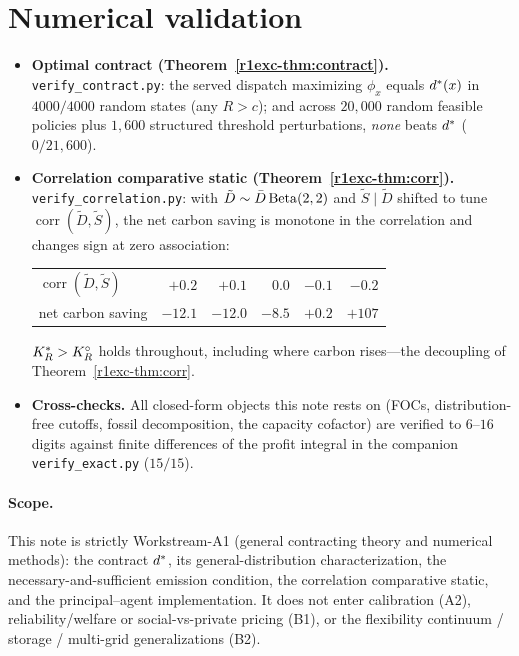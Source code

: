 \section{Numerical validation}\label{r1exc-sec:num}

\begin{itemize}[leftmargin=1.6em]
  \item \textbf{Optimal contract (Theorem~\ref{r1exc-thm:contract}).}
        \texttt{verify\_contract.py}: the served dispatch maximizing
        $\phi_x$ equals $d^{*}(x)$ in $4000/4000$ random states (any $R>c$); and
        across $20{,}000$ random feasible policies plus $1{,}600$ structured
        threshold perturbations, \emph{none} beats $d^{*}$ ($0/21{,}600$).
  \item \textbf{Correlation comparative static (Theorem~\ref{r1exc-thm:corr}).}
        \texttt{verify\_correlation.py}: with $\tilde D\sim\bar D\,\mathrm{Beta}(2,2)$
        and $\tilde S\mid\tilde D$ shifted to tune $\operatorname{corr}(\tilde D,\tilde S)$,
        the net carbon saving is monotone in the correlation and changes sign at
        zero association:
        \begin{center}\small
        \begin{tabular}{lrrrrr}
        \toprule
        $\operatorname{corr}(\tilde D,\tilde S)$ & $+0.2$ & $+0.1$ & $0.0$ & $-0.1$ & $-0.2$\\
        net carbon saving & $-12.1$ & $-12.0$ & $-8.5$ & $+0.2$ & $+107$\\
        \bottomrule
        \end{tabular}
        \end{center}
        $K_R^{*}>K_R^{\circ}$ holds throughout, including where carbon rises---the
        decoupling of Theorem~\ref{r1exc-thm:corr}.
  \item \textbf{Cross-checks.} All closed-form objects this note rests on
        (FOCs, distribution-free cutoffs, fossil decomposition, the capacity
        cofactor) are verified to $6$--$16$ digits against finite differences of
        the profit integral in the companion \texttt{verify\_exact.py}
        ($15/15$).
\end{itemize}

\paragraph{Scope.} This note is strictly Workstream-A1 (general contracting theory
and numerical methods): the contract $d^{*}$, its general-distribution
characterization, the necessary-and-sufficient emission condition, the correlation
comparative static, and the principal--agent implementation. It does not enter
calibration (A2), reliability/welfare or social-vs-private pricing (B1), or the
flexibility continuum / storage / multi-grid generalizations (B2).
